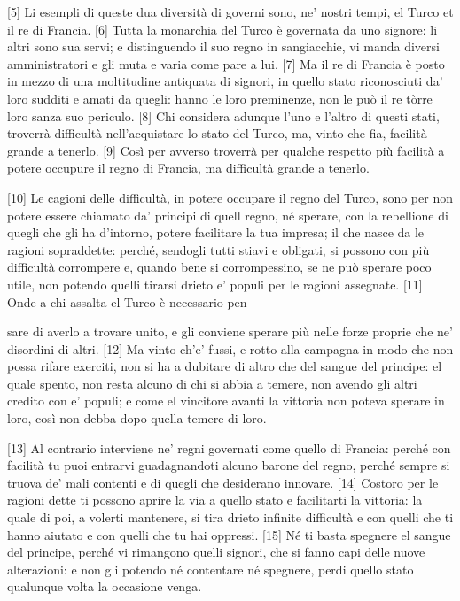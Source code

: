 {[}5{]} Li esempli di queste dua diversità di governi sono, ne' nostri
tempi, el Turco et il re di Francia. {[}6{]} Tutta la monarchia del
Turco è governata da uno signore: li altri sono sua servi; e
distinguendo il suo regno in sangiacchie, vi manda diversi
amministratori e gli muta e varia come pare a lui. {[}7{]} Ma il re di
Francia è posto in mezzo di una moltitudine antiquata di signori, in
quello stato riconosciuti da' loro sudditi e amati da quegli: hanno le
loro preminenze, non le può il re tòrre loro sanza suo periculo. {[}8{]}
Chi considera adunque l'uno e l'altro di questi stati, troverrà
difficultà nell'acquistare lo stato del Turco, ma, vinto che fia,
facilità grande a tenerlo. {[}9{]} Così per avverso troverrà per qualche
respetto più facilità a potere occupure il regno di Francia, ma
difficultà grande a tenerlo.

{[}10{]} Le cagioni delle difficultà, in potere occupare il regno del
Turco, sono per non potere essere chiamato da' principi di quell regno,
né sperare, con la rebellione di quegli che gli ha d'intorno, potere
facilitare la tua impresa; il che nasce da le ragioni sopraddette:
perché, sendogli tutti stiavi e obligati, si possono con più difficultà
corrompere e, quando bene si corrompessino, se ne può sperare poco
utile, non potendo quelli tirarsi drieto e' populi per le ragioni
assegnate. {[}11{]} Onde a chi assalta el Turco è necessario pen-

\quebra

\noindent{}sare di
averlo a trovare unito, e gli conviene sperare più nelle forze proprie
che ne' disordini di altri. {[}12{]} Ma vinto ch'e' fussi, e rotto alla
campagna in modo che non possa rifare exerciti, non si ha a dubitare di
altro che del sangue del principe: el quale spento, non resta alcuno di
chi si abbia a temere, non avendo gli altri credito con e' populi; e
come el vincitore avanti la vittoria non poteva sperare in loro, così
non debba dopo quella temere di loro.

{[}13{]} Al contrario interviene ne' regni governati come quello di
Francia: perché con facilità tu puoi entrarvi guadagnandoti alcuno
barone del regno, perché sempre si truova de' mali contenti e di quegli
che desiderano innovare. {[}14{]} Costoro per le ragioni dette ti
possono aprire la via a quello stato e facilitarti la vittoria: la quale
di poi, a volerti mantenere, si tira drieto infinite difficultà e con
quelli che ti hanno aiutato e con quelli che tu hai oppressi. {[}15{]}
Né ti basta spegnere el sangue del principe, perché vi rimangono quelli
signori, che si fanno capi delle nuove alterazioni: e non gli potendo né
contentare né spegnere, perdi quello stato qualunque volta la occasione
venga.

